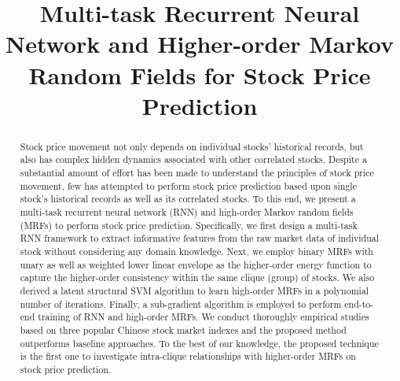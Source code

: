 \documentclass[sigconf,anonymous,review]{acmart}
\begin{document}
\title[Multi-task RNN and Higer-order MRFs for Stock Price Prediction]{Multi-task Recurrent Neural Network and
  Higher-order Markov Random Fields for Stock Price
  Prediction}




\begin{abstract}
  Stock price movement not only depends on individual stocks'
  historical records, but also has complex hidden dynamics associated with other correlated stocks. Despite a substantial amount of effort has been made to understand the principles of stock price movement, few has attempted to perform stock price prediction based upon
  single stock's historical records as well as its correlated stocks. To this end, we present a multi-task recurrent neural network (RNN) and high-order Markov random fields (MRFs) to perform stock price prediction. Specifically, we first design a multi-task RNN framework to extract informative features from the raw market data of individual stock without considering any domain knowledge. Next, we employ binary MRFs with
  unary as well as weighted lower linear envelope as the higher-order energy
  function to capture the higher-order consistency within the same clique (group) of stocks. We also derived a latent structural SVM algorithm to learn high-order MRFs in a
  polynomial number of iterations. Finally, a sub-gradient
  algorithm is employed to perform end-to-end training of RNN and
  high-order MRFs. We conduct thoroughly empirical studies based on three popular Chinese
  stock market indexes and the proposed method outperforms baseline approaches. To the best of our knowledge, the proposed technique is the first one to
  investigate intra-clique relationships with higher-order MRFs on stock price prediction.
\end{abstract}
\end{document}
